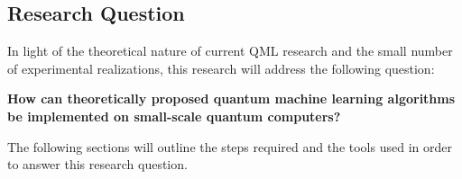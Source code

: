\documentclass[a4paper]{article}
\newcommand*{\0}{$\ket{0}$}
\newcommand*{\1}{$\ket{1}$}
\begin{document}


\subsection{Research Question}
\label{subsec:researchquestion}

In light of the theoretical nature of current QML research and the small number of experimental realizations, this research will address the following question:

\centering\textbf{How can theoretically proposed quantum machine learning algorithms be implemented on small-scale quantum computers?}


\justify
The following sections will outline the steps required and the tools used in order to answer this research question. 
\end{document}
